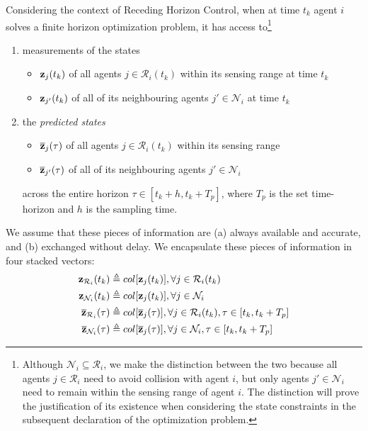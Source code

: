 \begin{gg_box}
\begin{assumption}
Considering the context of Receding Horizon Control, when
at time $t_k$ agent $i$ solves a finite horizon optimization problem, it has
access to\footnote{Although
  $\mathcal{N}_i \subseteq \mathcal{R}_i$, we make the distinction between
  the two because all agents $j \in \mathcal{R}_i$ need to avoid collision
  with agent $i$, but only agents $j' \in \mathcal{N}_i$ need to remain
  within the sensing range of agent $i$. The distinction will prove the
  justification of its existence when considering the state constraints
  in the subsequent declaration of the optimization problem.}

\begin{enumerate}
  \item measurements of the states
    \begin{itemize}
      \item $\bm{\mathbf{z}}_j(t_k)$ of all agents $j \in \mathcal{R}_i(t_k)$ within its sensing range at time $t_k$
      \item $\bm{\mathbf{z}}_{j'}(t_k)$ of all of its neighbouring agents $j' \in \mathcal{N}_i$ at time $t_k$
      \end{itemize}
    \item the \textit{predicted states}
      \begin{itemize}
        \item $\overline{\bm{\mathbf{z}}}_j(\tau)$ of all agents $j \in \mathcal{R}_i(t_k)$ within its sensing range
        \item $\overline{\bm{\mathbf{z}}}_{j'}(\tau)$ of all of its neighbouring agents $j' \in \mathcal{N}_i$
      \end{itemize}
      across the entire horizon $\tau \in [t_k + h, t_k + T_p]$, where $T_p$ is the
      set time-horizon and $h$ is the sampling time.
\end{enumerate}
\end{assumption}
\end{gg_box}
We assume that these pieces of information are (a) always available and
accurate, and (b) exchanged without delay. We encapsulate these pieces of
information in four stacked vectors:
\begin{subequations}
\begin{align}
  \bm{\mathbf{z}}_{\mathcal{R}_i}(t_k) &\triangleq col[\bm{\mathbf{z}}_j(t_k)], \forall j \in \mathcal{R}_i(t_k) \\
  \bm{\mathbf{z}}_{\mathcal{N}_i}(t_k) &\triangleq col[\bm{\mathbf{z}}_j(t_k)], \forall j \in \mathcal{N}_i \\
  \overline{\bm{\mathbf{z}}}_{\mathcal{R}_i}(\tau) &\triangleq col[\overline{\bm{\mathbf{z}}}_j(\tau)], \forall j \in \mathcal{R}_i(t_k), \tau \in [t_k, t_k + T_p] \\
  \overline{\bm{\mathbf{z}}}_{\mathcal{N}_i}(\tau) &\triangleq col[\overline{\bm{\mathbf{z}}}_j(\tau)], \forall j \in \mathcal{N}_i, \tau \in [t_k, t_k + T_p]
\end{align}
\end{subequations}

